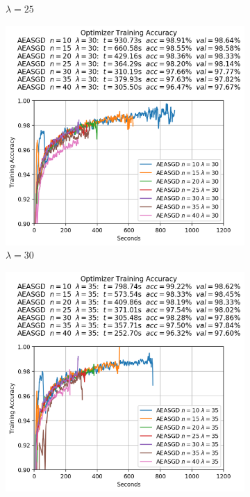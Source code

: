\begin{figure}
\begin{subfigure}{.3\textwidth}
    \caption{$\lambda = 25$}
  \end{subfigure}
  \begin{subfigure}{.3\textwidth}
    \centering
    \includegraphics[width=\linewidth]{resources/images/aeasgd_experiments_lambda_30}
    \caption{$\lambda = 30$}
  \end{subfigure}
  \begin{subfigure}{.3\textwidth}
    \centering
    \includegraphics[width=\linewidth]{resources/images/aeasgd_experiments_lambda_35}

\end{subfigure}
\end{figure}

